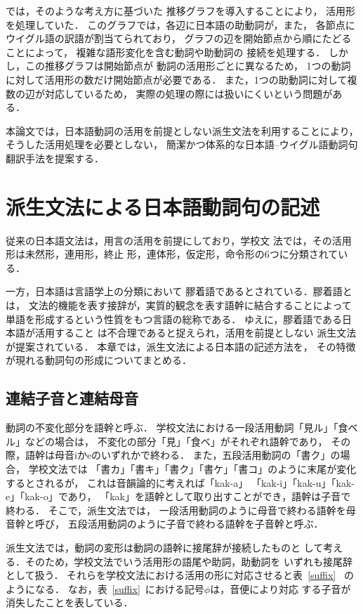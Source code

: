 \cite{MUHTAR}では，そのような考え方に基づいた
推移グラフを導入することにより，
活用形を処理していた．
このグラフでは，各辺に日本語の助動詞が，また，
各節点にウイグル語の訳語が割当てられており，
グラフの辺を開始節点から順にたどることによって，
複雑な語形変化を含む動詞や助動詞の
接続を処理する．
しかし，この推移グラフは開始節点が
動詞の活用形ごとに異なるため，
1つの動詞に対して活用形の数だけ開始節点が必要である．
また，1つの助動詞に対して複数の辺が対応しているため，
実際の処理の際には扱いにくいという問題がある．

本論文では，日本語動詞の活用を前提としない派生文法を利用することにより，
そうした活用処理を必要としない，
簡潔かつ体系的な日本語--ウイグル語動詞句翻訳手法を提案する．

\section{派生文法による日本語動詞句の記述}
\label{sec:derivational_grammar}
従来の日本語文法は，用言の活用を前提にしており，学校文
法では，その活用形は未然形，連用形，終止
形，連体形，仮定形，命令形の6つに分類されている．

一方，日本語は言語学上の分類において
{\dg 膠着語}であるとされている．膠着語とは，
文法的機能を表す接辞が，実質的観念を表す語幹に結合することによって
単語を形成するという性質をもつ言語の総称である．
ゆえに，膠着語である日本語が活用すること
は不合理であると捉えられ，活用を前提としない
{\dg 派生文法}\cite{KIYOSE1}\cite{KIYOSE2}が提案されている．
本章では，派生文法による日本語の記述方法を，
その特徴が現れる動詞句の形成についてまとめる．

\subsection{連結子音と連結母音}
\label{sec:union}
動詞の不変化部分を語幹と呼ぶ．
学校文法における一段活用動詞「見ル」「食ベル」などの場合は，
不変化の部分「見」「食ベ」がそれぞれ語幹であり，
その際，語幹は母音iかeのいずれかで終わる．
また，五段活用動詞の「書ク」の場合，
学校文法では
「書カ」「書キ」「書ク」「書ケ」「書コ」のように末尾が変化
するとされるが，
これは音韻論的に考えれば「kak-a」
「kak-i」「kak-u」「kak-e」「kak-o」であり，
「kak」を語幹として取り出すことができ，語幹は子音で終わる．
そこで，派生文法では，
一段活用動詞のように母音で終わる語幹を{\dg 母音幹}と呼び，
五段活用動詞のように子音で終わる語幹を{\dg 子音幹}と呼ぶ．

派生文法では，動詞の変形は動詞の語幹に接尾辞が接続したものと
して考える．そのため，学校文法でいう活用形の語尾や助詞，助動詞を
いずれも接尾辞として扱う．
それらを学校文法における活用の形に対応させると表~\ref{suffix}~
のようになる．
なお，表~\ref{suffix}~における記号$\phi$は，音便により対応
する子音が消失したことを表している．

